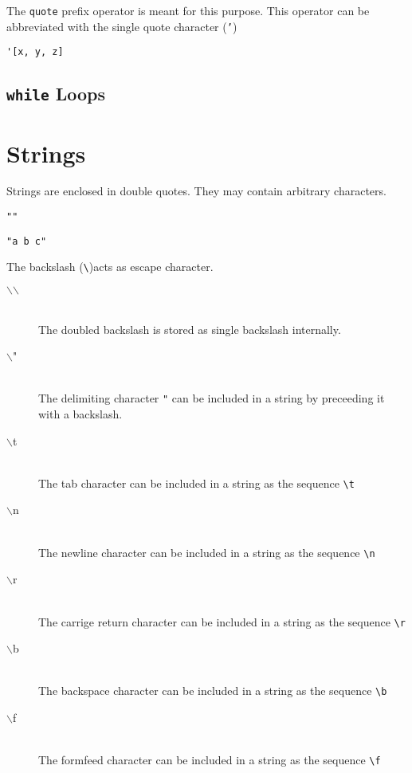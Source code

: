 \documentclass[11pt,a4paper]{scrbook}
\newcommand\BS{\(\backslash\)}
\newcommand\keyword[1]{\texttt{#1}}
\begin{document}
The \keyword{quote} prefix operator is meant for this purpose. This operator
can be abbreviated with the single quote character (\keyword{'})

\begin{lstlisting}[language=BibTool]
'[x, y, z]
\end{lstlisting}


\subsection{\keyword{while} Loops}



\section{Strings}

Strings are enclosed in double quotes. They may contain arbitrary characters.

\begin{lstlisting}[language=BibTool]
""
\end{lstlisting}

\begin{lstlisting}[language=BibTool]
"a b c"
\end{lstlisting}

The backslash (\verb|\|)acts as escape character.
\begin{description}
\item [\ttfamily\BS\BS] \ \\The doubled backslash is stored as single backslash
  internally.
\item [\ttfamily\BS "] \ \\The delimiting character \verb|"| can be included in a
  string by preceeding it with a backslash.
\item [\ttfamily\BS t] \ \\The tab character can be included in a string as the
  sequence \verb|\t|
\item [\ttfamily\BS n] \ \\The newline character can be included in a string as the
  sequence \verb|\n|
\item [\ttfamily\BS r] \ \\The carrige return character can be included in a string as
  the sequence \verb|\r|
\item [\ttfamily\BS b] \ \\The backspace character can be included in a string as the
  sequence \verb|\b|
\item [\ttfamily\BS f] \ \\The formfeed character can be included in a string as the
  sequence \verb|\f|
\end{description}
\end{document}
